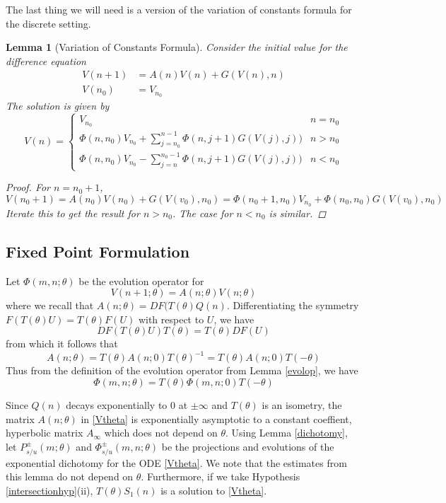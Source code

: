 \documentclass[12pt]{article}
\newtheorem{lemma}{Lemma}
\begin{document}
The last thing we will need is a version of the variation of constants formula for the discrete setting.

\begin{lemma}[Variation of Constants Formula]\label{VOC}
Consider the initial value for the difference equation
\begin{align*}
V(n+1) &= A(n) V(n) + G(V(n), n) \\
V(n_0) &= V_{n_0}
\end{align*}
The solution is given by
\begin{equation}\label{VOCformula}
V(n) = 
\begin{cases}
V_{n_0} & n = n_0 \\
\Phi(n, n_0) V_{n_0} + \sum_{j = n_0}^{n-1} \Phi(n, j+1) G(V(j), j)) & n > n_0 \\
\Phi(n, n_0) V_{n_0} - \sum_{j = n}^{n_0-1} \Phi(n, j+1) G(V(j), j)) & n < n_0 
\end{cases}
\end{equation}
\begin{proof}
For $n = n_0 + 1$,
\[
V(n_0 + 1) = A(n_0) V(n_0) + G(V(v_0), n_0) = \Phi(n_0+1, n_0) V_{n_0} + \Phi(n_0, n_0) G(V(v_0), n_0)
\]
Iterate this to get the result for $n > n_0$. The case for $n < n_0$ is similar.
\end{proof}
\end{lemma}

\subsection{Fixed Point Formulation}

Let $\Phi(m, n; \theta)$ be the evolution operator for 
\begin{equation}\label{Vtheta}
V(n+1; \theta) = A(n; \theta) V(n; \theta) 
\end{equation}
where we recall that $A(n; \theta) = DF(T(\theta)Q(n)$. Differentiating the symmetry $F(T(\theta)U) = T(\theta)F(U)$ with respect to $U$, we have 
\[
DF(T(\theta)U)T(\theta) = T(\theta)DF(U)
\]
from which it follows that
\[
A(n; \theta) = T(\theta)A(n; 0)T(\theta)^{-1} = T(\theta)A(n; 0)T(-\theta)
\]
Thus from the definition of the evolution operator from Lemma \ref{evolop}, we have
\[
\Phi(m, n; \theta) = T(\theta)\Phi(m, n; 0)T(-\theta)
\]

Since $Q(n)$ decays exponentially to 0 at $\pm \infty$ and $T(\theta)$ is an isometry, the matrix $A(n; \theta)$ in \eqref{Vtheta} is exponentially asymptotic to a constant coeffient, hyperbolic matrix $A_\infty$ which does not depend on $\theta$. Using Lemma \ref{dichotomy}, let $P_{s/u}^\pm(m; \theta)$ and $\Phi_{s/u}^\pm(m, n; \theta)$ be the projections and evolutions of the exponential dichotomy for the ODE \ref{Vtheta}. We note that the estimates from this lemma do not depend on $\theta$. Furthermore, if we take Hypothesis \ref{intersectionhyp}(ii), $T(\theta)S_1(n)$ is a solution to \eqref{Vtheta}.
\end{document}
